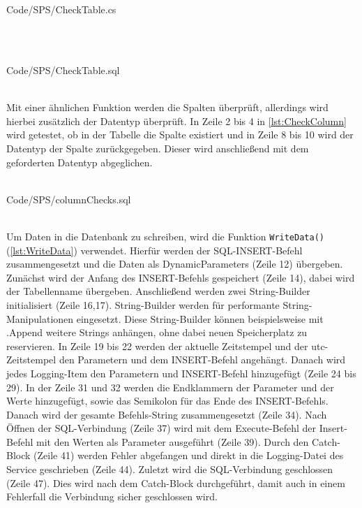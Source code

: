 \ \\
\begin{minipage}{\textwidth}
\ \\
 {Code/SPS/CheckTable.cs}
\ \\
\end{minipage}
\ \\
\begin{minipage}{\textwidth}
\ \\
 {Code/SPS/CheckTable.sql}
\ \\
\end{minipage}
\ \\
Mit einer ähnlichen Funktion werden die Spalten überprüft, allerdings wird hierbei zusätzlich der Datentyp überprüft. In Zeile 2 bis 4 in \autoref{lst:CheckColumn} wird getestet, ob in der Tabelle die Spalte existiert und in Zeile 8 bis 10 wird der Datentyp der Spalte zurückgegeben. Dieser wird anschließend mit dem geforderten Datentyp abgeglichen. 
\ \\
\begin{minipage}{\textwidth}
\ \\
 {Code/SPS/columnChecks.sql}
\ \\
\end{minipage}
\ \\
Um Daten in die Datenbank zu schreiben, wird die Funktion \texttt{WriteData()} (\autoref{lst:WriteData}) verwendet. Hierfür werden der SQL-INSERT-Befehl zusammengesetzt und die Daten als DynamicParameters (Zeile 12) übergeben. Zunächst wird der Anfang des INSERT-Befehls gespeichert (Zeile 14), dabei wird der Tabellenname übergeben. Anschließend werden zwei String-Builder initialisiert (Zeile 16,17). String-Builder werden für performante String-Manipulationen eingesetzt. Diese String-Builder können beispielsweise mit .Append weitere Strings anhängen, ohne dabei neuen Speicherplatz zu reservieren. In Zeile 19 bis 22 werden der aktuelle Zeitstempel und der \ac{utc}-Zeitstempel den Parametern und dem INSERT-Befehl angehängt. Danach wird jedes Logging-Item den Parametern und INSERT-Befehl hinzugefügt (Zeile 24 bis 29). In der Zeile 31 und 32 werden die Endklammern der Parameter und der Werte hinzugefügt, sowie das Semikolon für das Ende des INSERT-Befehls. Danach wird der gesamte Befehls-String zusammengesetzt (Zeile 34). Nach Öffnen der SQL-Verbindung (Zeile 37) wird mit dem Execute-Befehl der Insert-Befehl mit den Werten als Parameter ausgeführt (Zeile 39). Durch den Catch-Block (Zeile 41) werden Fehler abgefangen und direkt in die Logging-Datei des Service geschrieben (Zeile 44). Zuletzt wird die SQL-Verbindung geschlossen (Zeile 47). Dies wird nach dem Catch-Block durchgeführt, damit auch in einem Fehlerfall die Verbindung sicher geschlossen wird.
